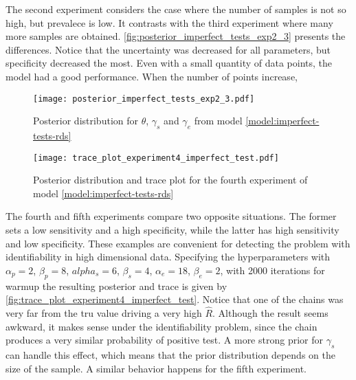 The second experiment considers the case where the number of samples is not so
high, but prevalece is low. It contrasts with the third experiment where many
more samples are obtained. \autoref{fig:posterior_imperfect_tests_exp2_3}
presents the differences. Notice that the uncertainty was decreased for all
parameters, but specificity decreased the most. Even with a small quantity of
data points, the model had a good performance. When the number of points
increase,

\begin{figure}[ht]
  \centering
  \caption{\label{fig:posterior_imperfect_tests_exp2_3} Posterior
    distribution for $\theta$, $\gamma_s$ and $\gamma_e$ from model
    \eqref{model:imperfect-tests-rds}}
  \texttt{[image: posterior\_imperfect\_tests\_exp2\_3.pdf]}
\end{figure}

\begin{figure}[htbp]
  \centering
  \caption{\label{fig:trace_plot_experiment4_imperfect_test}Posterior distribution
    and trace plot for the fourth experiment of model
    \eqref{model:imperfect-tests-rds}}
  \texttt{[image: trace\_plot\_experiment4\_imperfect\_test.pdf]}
\end{figure}

The fourth and fifth experiments compare two opposite situations. The former
sets a low sensitivity and a high specificity, while the latter has high
sensitivity and low specificity. These examples are convenient for detecting
the problem with identifiability in high dimensional data. Specifying the hyperparameters with $\alpha_p =
  2$,  $\beta_p = 8$, $alpha_s = 6$, $\beta_s = 4$, $\alpha_e = 18$, $\beta_e =
  2$, with 2000 iterations for warmup the resulting posterior and trace is given
by \autoref{fig:trace_plot_experiment4_imperfect_test}. Notice that one of the
chains was very far from the tru value driving a very high $\hat{R}$. Although
the result seems awkward, it makes sense under the identifiability problem,
since the chain produces a very similar probability of positive test. A more
strong prior for $\gamma_s$ can handle this effect, which means that the prior
distribution depends on the size of the sample. A similar behavior happens
for the fifth experiment.


